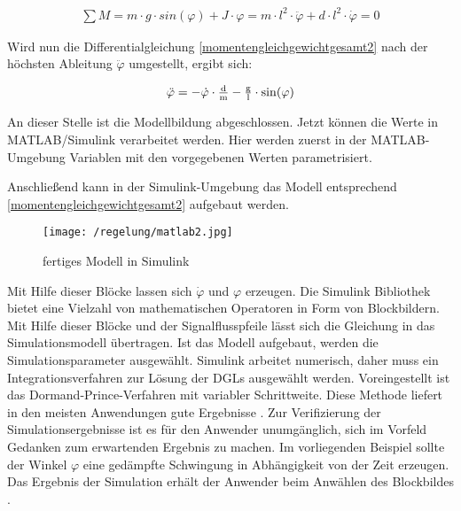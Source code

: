 \begin{align}
	\sum M = m \cdot g \cdot \si{sin}(\varphi) + J \cdot \varphi = m \cdot l^{2} \cdot \ddot\varphi + d \cdot l^{2} \cdot \dot\varphi = 0
	\label{momentengleichgewichtgesamt2} 
\end{align}

Wird nun die Differentialgleichung \ref{momentengleichgewichtgesamt2} nach der höchsten Ableitung $\ddot\varphi$ umgestellt, ergibt sich:

\begin{align}
	\ddot\varphi = -\dot\varphi \cdot \tfrac{\i{d}}{\i{m}} - \tfrac{\i{g}}{\i{l}} \cdot \si{sin}(\varphi)
	\label{diffgleichung} 
\end{align}

An dieser Stelle ist die Modellbildung abgeschlossen. Jetzt können die Werte in MATLAB/Simulink  verarbeitet werden.
Hier werden zuerst in der MATLAB-Umgebung Variablen mit den vorgegebenen Werten parametrisiert.


Anschließend kann in der Simulink-Umgebung das Modell entsprechend \ref{momentengleichgewichtgesamt2} aufgebaut werden.

\begin{figure}[h]
	\centering
	\texttt{[image: /regelung/matlab2.jpg]}
	\label{fig:matlab2}
	\caption{fertiges Modell in Simulink}
\end{figure}

Mit Hilfe dieser Blöcke lassen sich  $\dot{\varphi}$ und $\varphi$ erzeugen.
Die Simulink Bibliothek bietet eine Vielzahl von mathematischen Operatoren in Form von Blockbildern.
Mit Hilfe dieser Blöcke und der Signalflusspfeile lässt sich die Gleichung in das Simulationsmodell übertragen.
Ist das Modell aufgebaut, werden die Simulationsparameter ausgewählt. 
Simulink arbeitet numerisch, daher muss ein Integrationsverfahren zur Lösung der DGLs ausgewählt werden. Voreingestellt ist das Dormand-Prince-Verfahren mit variabler Schrittweite.
Diese Methode liefert in den meisten Anwendungen gute Ergebnisse \autocite{scherf2010}.
Zur Verifizierung der Simulationsergebnisse ist es für den Anwender unumgänglich, sich im Vorfeld Gedanken zum erwartenden Ergebnis zu machen.
Im vorliegenden Beispiel sollte der Winkel $\varphi$ eine gedämpfte Schwingung in Abhängigkeit von der Zeit erzeugen.
Das Ergebnis der Simulation erhält der Anwender beim Anwählen des Blockbildes \grqq.

